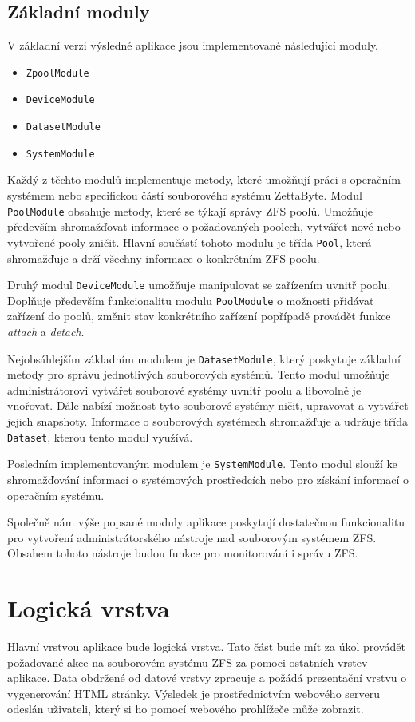     \subsection{Základní moduly}
    V základní verzi výsledné aplikace jsou implementované následující moduly.
    \begin{itemize}
      \item \verb|ZpoolModule|
      \item \verb|DeviceModule|
      \item \verb|DatasetModule|
      \item \verb|SystemModule|
    \end{itemize}

    Každý z těchto modulů implementuje metody, které umožňují práci s operačním systémem nebo specifickou částí souborového systému ZettaByte. Modul \verb|PoolModule| obsahuje metody, které se týkají správy ZFS poolů. Umožňuje především shromažďovat informace o požadovaných poolech, vytvářet nové nebo vytvořené pooly zničit. Hlavní součástí tohoto modulu je třída \verb|Pool|, která shromažďuje a drží všechny informace o konkrétním ZFS poolu.

    Druhý modul \verb|DeviceModule| umožňuje manipulovat se zařízením uvnitř poolu. Doplňuje především funkcionalitu modulu \verb|PoolModule| o možnosti přidávat zařízení do poolů, změnit stav konkrétního zařízení popřípadě provádět funkce \emph{attach} a \emph{detach}.

    Nejobsáhlejším základním modulem je \verb|DatasetModule|, který poskytuje základní metody pro správu jednotlivých souborových systémů. Tento modul umožňuje administrátorovi vytvářet souborové systémy uvnitř poolu a libovolně je vnořovat. Dále nabízí možnost tyto souborové systémy ničit, upravovat a vytvářet jejich snapshoty. Informace o souborových systémech shromažďuje a udržuje třída \verb|Dataset|, kterou tento modul využívá.

    Posledním implementovaným modulem je \verb|SystemModule|. Tento modul slouží ke shromažďování informací o systémových prostředcích nebo pro získání informací o operačním systému.

    Společně nám výše popsané moduly aplikace poskytují dostatečnou funkcionalitu pro vytvoření administrátorského nástroje nad souborovým systémem ZFS. Obsahem tohoto nástroje budou funkce pro monitorování i správu ZFS.
\section{Logická vrstva}
Hlavní vrstvou aplikace bude logická vrstva. Tato část bude mít za úkol provádět požadované akce na souborovém systému ZFS za pomoci ostatních vrstev aplikace. Data obdržené od datové vrstvy zpracuje a požádá prezentační vrstvu o vygenerování HTML stránky. Výsledek je prostřednictvím webového serveru odeslán uživateli, který si ho pomocí webového prohlížeče může zobrazit.

